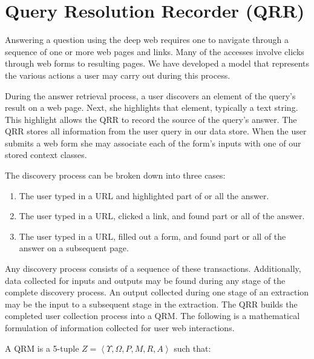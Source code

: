 \section{Query Resolution Recorder (QRR)}
\label{sec:qrr}
Answering a question using the deep web requires one to navigate
through a sequence of one or more web pages and links.  Many of the
accesses involve clicks through web forms to resulting pages.  We have
developed a model that represents the various actions a user may carry
out during this process.

During the answer retrieval process, a user discovers an element of
the query's result on a web page.  Next, she highlights that element,
typically a text string.  This highlight allows the QRR to record the
source of the query's answer.  The QRR stores all information from the
user query in our data store.  When the user submits a web form she
may associate each of the form's inputs with one of our stored context
classes.

The discovery process can be broken down into three cases:
\begin{enumerate}
\item The user typed in a URL and highlighted part of or all the
  answer.
\item The user typed in a URL, clicked a link, and found part or all
  of the answer.
\item The user typed in a URL, filled out a form, and found part or
  all of the answer on a subsequent page.
\end{enumerate}

Any discovery process consists of a sequence of these transactions.
Additionally, data collected for inputs and outputs may be found
during any stage of the complete discovery process.  An output
collected during one stage of an extraction may be the input to a
subsequent stage in the extraction.  The QRR builds the completed user
collection process into a QRM.  The following is a mathematical
formulation of information collected for user web interactions.

A QRM is a 5-tuple $Z = \left< \Upsilon, \Omega, P, M, R, A \right>$ such that:

